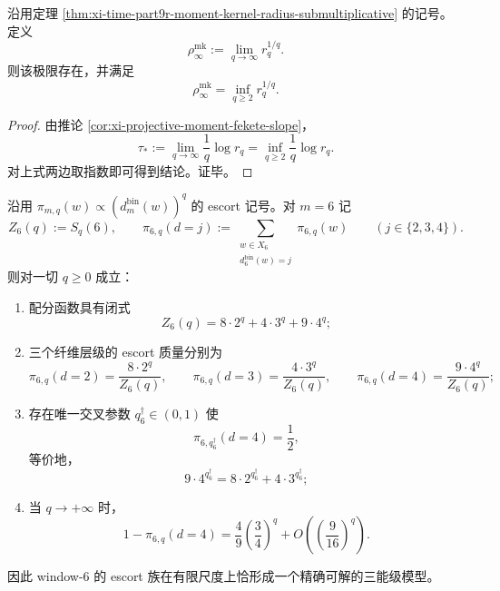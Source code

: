 \begin{corollary}\label{cor:xi-time-part9r-moment-kernel-root-scale}
沿用定理 \ref{thm:xi-time-part9r-moment-kernel-radius-submultiplicative} 的记号。定义
\[
\rho_{\infty}^{\mathrm{mk}}
:=
\lim_{q\to\infty} r_q^{1/q}.
\]
则该极限存在，并满足
\[
\rho_{\infty}^{\mathrm{mk}}
=
\inf_{q\ge 2} r_q^{1/q}.
\]
\end{corollary}
\begin{proof}
由推论 \ref{cor:xi-projective-moment-fekete-slope}，
\[
\tau_\ast:=\lim_{q\to\infty}\frac{1}{q}\log r_q
=
\inf_{q\ge 2}\frac{1}{q}\log r_q.
\]
对上式两边取指数即可得到结论。证毕。
\end{proof}

\begin{theorem}\label{thm:xi-time-part9r-window6-escort-threelevel-exact}
沿用 \(\pi_{m,q}(w)\propto (d_m^{\mathrm{bin}}(w))^q\) 的 escort 记号。对 \(m=6\) 记
\[
Z_6(q):=S_q(6),
\qquad
\pi_{6,q}(d=j):=
\sum_{\substack{w\in X_6\\ d_6^{\mathrm{bin}}(w)=j}}\pi_{6,q}(w)
\qquad (j\in\{2,3,4\}).
\]
则对一切 \(q\ge 0\) 成立：
\begin{enumerate}
  \item 配分函数具有闭式
  \[
  Z_6(q)=8\cdot 2^q+4\cdot 3^q+9\cdot 4^q;
  \]
  \item 三个纤维层级的 escort 质量分别为
  \[
  \pi_{6,q}(d=2)=\frac{8\cdot 2^q}{Z_6(q)},
  \qquad
  \pi_{6,q}(d=3)=\frac{4\cdot 3^q}{Z_6(q)},
  \qquad
  \pi_{6,q}(d=4)=\frac{9\cdot 4^q}{Z_6(q)};
  \]
  \item 存在唯一交叉参数 \(q_6^\dagger\in(0,1)\) 使
  \[
  \pi_{6,q_6^\dagger}(d=4)=\frac12,
  \]
  等价地，
  \[
  9\cdot 4^{q_6^\dagger}=8\cdot 2^{q_6^\dagger}+4\cdot 3^{q_6^\dagger};
  \]
  \item 当 \(q\to+\infty\) 时，
  \[
  1-\pi_{6,q}(d=4)
  =
  \frac49\left(\frac34\right)^q
  +O\!\left(\left(\frac{9}{16}\right)^q\right).
  \]
\end{enumerate}
因此 window-\(6\) 的 escort 族在有限尺度上恰形成一个精确可解的三能级模型。
\end{theorem}
